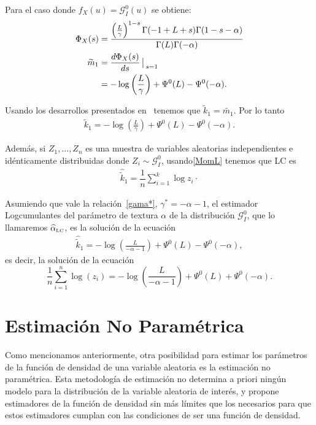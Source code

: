 Para el caso donde $f_X(u) = \mathcal{G}_I^0(u)$ se obtiene:
	\begin{align}
	\Phi_X(s) &= \dfrac{\left(\frac{L}{\gamma}\right)^{1-s}\Gamma(-1+L+s)\Gamma(1-s-\alpha)}{\Gamma(L)\Gamma(-\alpha)} \\
	\vspace{1cm}
	\nonumber \widetilde{m}_1 &=  \frac{d \Phi_X(s)}{ds } \big\arrowvert _{s=1}\\
					& = -\log\left(\frac{L}{\gamma}\right) + \Psi^0(L) - \Psi^0(-\alpha).
	\end{align}

Usando los desarrollos presentados en~\citet{Tison2004} tenemos que $\widetilde{k}_1 = \widetilde{m_1}$. Por lo tanto 
\begin{align}
\label{MomLC}
\widetilde{k}_1 =   -\log \left(\frac{L}{\gamma}\right) + \Psi^0(L) - \Psi^0(-\alpha).
\end{align}

Además, si $Z_1,\ldots,Z_n$ es una muestra de variables aleatorias independientes e idénticamente distribuidas donde $Z_i \sim \mathcal{G}_I^0$, usando\eqref{MomL} tenemos que LC es
\begin{align}
\label{EstimadorMomLC}
\widehat{\widetilde{k}}_1 =\dfrac{1}{n} \sum_{i=1}^k\log z_i\cdot
\end{align}

Asumiendo que vale la relación~\eqref{gama*}, $\gamma^*=-\alpha-1$, el estimador Logcumulantes del parámetro de textura $\alpha$ de la distribución $\mathcal{G}_I^0$, que lo llamaremos $\widehat\alpha_{\text{\tiny{LC}}}$, es la solución de la ecuación    
\begin{align}
\widehat{\widetilde{k}}_1 =   -\log \left(\frac{L}{-\alpha-1}\right) + \Psi^0(L) - \Psi^0(-\alpha),
\end{align}
es decir, la solución de la ecuación
\begin{equation} \label{eq:logm}
\frac{1}{n} \sum_{i=1}^n\log (z_i) =   -\log \left(\frac{L}{-\alpha-1}\right) + \Psi^0(L) + \Psi^0(-\alpha).
\end{equation}


\section{Estimación No Paramétrica}

Como mencionamos anteriormente, otra posibilidad para estimar los parámetros de la función de densidad de una variable aleatoria es la estimación no paramétrica. Esta metodología de estimación  no determina a priori ningún modelo para la distribución de la variable aleatoria de interés, y propone estimadores de la función de densidad sin más límites que los necesarios para que estos estimadores cumplan con las condiciones de ser una función de densidad.


